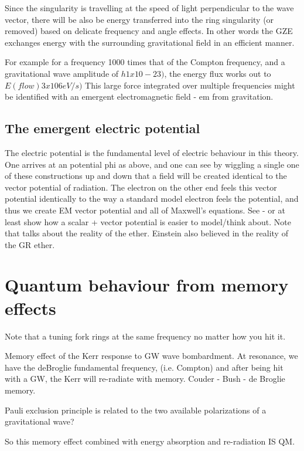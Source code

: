 \documentclass[../rzero]{subfiles}
\begin{document}
Since the singularity is travelling at the speed of light perpendicular to the wave vector, there will be also be energy transferred into the ring singularity (or removed) based on delicate frequency and angle effects. In other words the GZE exchanges energy with the surrounding gravitational field in an efficient manner.

For example for a frequency 1000 times that of the Compton frequency, and a gravitational wave amplitude of $h 1x10-23)$, the energy flux works out to $E(flow) 3x106 eV/s)$ This large force integrated over multiple frequencies might be identified with an emergent electromagnetic field - em from gravitation. 

\subsection{The emergent electric potential}


The electric potential is the fundamental level of electric behaviour in this theory. One arrives at an potential phi as above, and one can see by wiggling a single one of these constructions up and down that a field will be created identical to the vector potential of radiation. The electron on the other end feels this vector potential identically to the way a standard model electron feels the potential, and thus we create EM vector potential and all of Maxwell's equations. 
See \cite{Waves2017} - or at least show how a scalar + vector potential is easier to model/think about. Note that \cite{Waves2017} talks about the reality of the ether. Einstein also believed in the reality of the GR ether.\cite{Einstein1920}

\section{Quantum behaviour from memory effects}

Note that a tuning fork rings at the same frequency no matter how you hit it.

Memory effect of the Kerr response to GW wave bombardment. At resonance, we have the deBroglie fundamental frequency, (i.e. Compton) and after being hit with a GW, the Kerr will re-radiate with memory.  Couder - Bush - de Broglie memory. 

Pauli exclusion principle is related to the two available polarizations of a gravitational wave?

So this memory effect combined with energy absorption and re-radiation IS QM.
\end{document}
